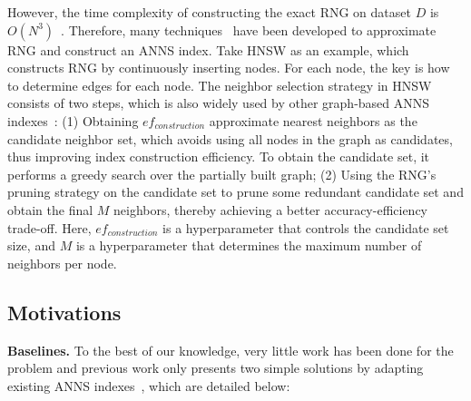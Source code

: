 However, the time complexity of constructing the exact RNG on dataset $D$ is $O(N^3)$~\cite{jaromczyk1991constructing}. Therefore, many techniques~\cite{fu2019fast,malkovEfficientRobustApproximate2020,harwood2016fanng,chen2018sptag,iwasaki2015neighborhood,DBLP:journals/pami/FuWC22,liApproximateNearestNeighbor2020} have been developed to approximate RNG and construct an ANNS index. Take HNSW as an example, which constructs 
RNG by continuously inserting nodes. For each node, the key is how to determine edges for each node. The neighbor selection strategy in HNSW consists of two steps, which is also widely used by other graph-based ANNS indexes~\cite{fu2019fast,malkovEfficientRobustApproximate2020,harwood2016fanng,iwasaki2015neighborhood, DBLP:journals/is/MalkovPLK14}: (1) Obtaining $ef_{construction}$ approximate nearest neighbors as the candidate neighbor set, which avoids using all nodes in the graph as candidates, thus improving index construction efficiency. To obtain the candidate set, it performs a greedy search over the partially built graph; (2) Using the RNG's pruning strategy on the candidate set to prune some redundant candidate set and obtain the final $M$ neighbors, thereby achieving a better accuracy-efficiency trade-off. %
Here, $ef_{construction}$ is a hyperparameter that controls the candidate set size, and $M$ is a hyperparameter that determines the maximum number of neighbors per node. 

\subsection{Motivations}
\label{sec:motivations}
\noindent\textbf{Baselines.} To the best of our knowledge, very little work has been done for the \hvq problem and previous work only presents two simple solutions by adapting existing ANNS indexes~\cite{milvus2021}, which are detailed below:

